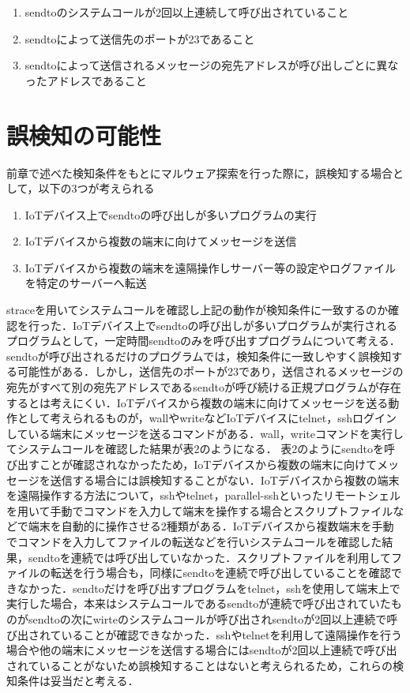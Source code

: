 \begin{enumerate}
\item sendtoのシステムコールが2回以上連続して呼び出されていること
\item sendtoによって送信先のポートが23であること
\item sendtoによって送信されるメッセージの宛先アドレスが呼び出しごとに異なったアドレスであること
\end{enumerate}


\section{誤検知の可能性}
前章で述べた検知条件をもとにマルウェア探索を行った際に，誤検知する場合として，以下の3つが考えられる

\begin{enumerate}
\item IoTデバイス上でsendtoの呼び出しが多いプログラムの実行
\item IoTデバイスから複数の端末に向けてメッセージを送信
\item IoTデバイスから複数の端末を遠隔操作しサーバー等の設定やログファイルを特定のサーバーへ転送
\end{enumerate}

straceを用いてシステムコールを確認し上記の動作が検知条件に一致するのか確認を行った．IoTデバイス上でsendtoの呼び出しが多いプログラムが実行されるプログラムとして，一定時間sendtoのみを呼び出すプログラムについて考える．sendtoが呼び出されるだけのプログラムでは，検知条件に一致しやすく誤検知する可能性がある．しかし，送信先のポートが23であり，送信されるメッセージの宛先がすべて別の宛先アドレスであるsendtoが呼び続ける正規プログラムが存在するとは考えにくい．IoTデバイスから複数の端末に向けてメッセージを送る動作として考えられるものが，wallやwriteなどIoTデバイスにtelnet，sshログインしている端末にメッセージを送るコマンドがある．wall，writeコマンドを実行してシステムコールを確認した結果が表2のようになる．%
表2のようにsendtoを呼び出すことが確認されなかったため，IoTデバイスから複数の端末に向けてメッセージを送信する場合には誤検知することがない．IoTデバイスから複数の端末を遠隔操作する方法について，sshやtelnet，parallel-sshといったリモートシェルを用いて手動でコマンドを入力して端末を操作する場合とスクリプトファイルなどで端末を自動的に操作させる2種類がある．IoTデバイスから複数端末を手動でコマンドを入力してファイルの転送などを行いシステムコールを確認した結果，sendtoを連続では呼び出していなかった．スクリプトファイルを利用してファイルの転送を行う場合も，同様にsendtoを連続で呼び出していることを確認できなかった．sendtoだけを呼び出すプログラムをtelnet，sshを使用して端末上で実行した場合，本来はシステムコールであるsendtoが連続で呼び出されていたものがsendtoの次にwirteのシステムコールが呼び出されsendtoが2回以上連続で呼び出されていることが確認できなかった．sshやtelnetを利用して遠隔操作を行う場合や他の端末にメッセージを送信する場合にはsendtoが2回以上連続で呼び出されていることがないため誤検知することはないと考えられるため，これらの検知条件は妥当だと考える．

